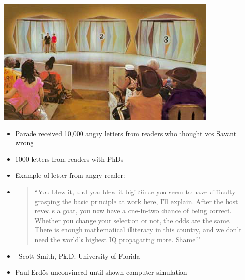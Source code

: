 \documentclass[handout]{beamer}
\theoremstyle{definition}
\begin{document}
\begin{frame}
\begin{center}\includegraphics[scale=.5]{Doors}\end{center}
\begin{itemize}
\item Parade received 10,000 angry letters from readers who thought
vos Savant wrong
\item 1000 letters from readers with PhDs
\end{itemize}
\end{frame}

\begin{frame}
\begin{itemize}
\item Example of letter from angry reader:
\item\begin{quotation}
``You blew it, and you blew it big! Since you seem to have difficulty
grasping the basic principle at work here, I'll explain. After the
host reveals a goat, you now have a one-in-two chance of being
correct. Whether you change your selection or not, the odds are the
same. There is enough mathematical illiteracy in this country, and
we don't need the world's highest IQ propagating more. Shame!''
\end{quotation}
\item[] --Scott Smith, Ph.D. University of Florida
\item Paul Erd\"os unconvinced until shown computer simulation
\end{itemize}
\end{frame}
\end{document}
